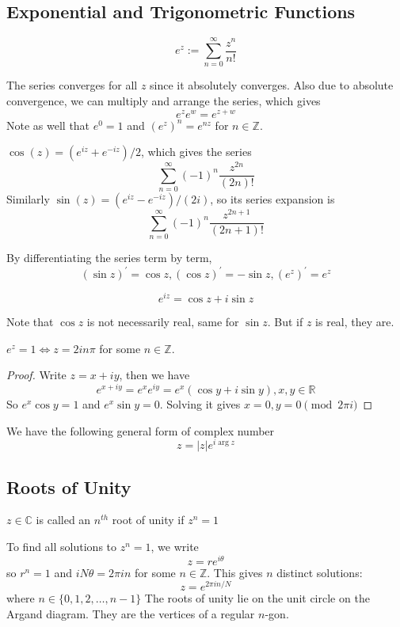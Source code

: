 \subsection{Exponential and Trigonometric Functions}
\begin{definition}
    $$e^z:=\sum_{n=0}^\infty \frac{z^n}{n!}$$
\end{definition}
The series converges for all $z$ since it absolutely converges.
Also due to absolute convergence, we can multiply and arrange the series, which gives
$$e^ze^w=e^{z+w}$$
Note as well that $e^0=1$ and $(e^z)^n=e^{nz}$ for $n\in\mathbb Z$.
\begin{definition}
    $\cos(z)=(e^{iz}+e^{-iz})/2$, which gives the series
    $$\sum_{n=0}^\infty(-1)^n\frac{z^{2n}}{(2n)!}$$
    Similarly $\sin(z)=(e^{iz}-e^{-iz})/(2i)$, so its series expansion is
    $$\sum_{n=0}^\infty(-1)^n\frac{z^{2n+1}}{(2n+1)!}$$
\end{definition}
By differentiating the series term by term,
$$(\sin z)^\prime=\cos z, (\cos z)^\prime =-\sin z, (e^z)^\prime=e^z$$
\begin{theorem}
    $$e^{iz}=\cos z+i\sin z$$
\end{theorem}
Note that $\cos z$ is not necessarily real, same for $\sin z$.
But if $z$ is real, they are.
\begin{lemma}
    $e^z=1\iff z=2in\pi$ for some $n\in\mathbb Z$.
\end{lemma}
\begin{proof}
    Write $z=x+iy$, then we have
    $$e^{x+iy}=e^xe^{iy}=e^x(\cos y+i\sin y),x,y\in\mathbb R$$
    So $e^x\cos y=1$ and $e^x\sin y=0$.
    Solving it gives $x=0, y=0\pmod{2\pi i}$
\end{proof}
We have the following general form of complex number
$$z=|z|e^{i\arg z}$$
\subsection{Roots of Unity}
\begin{definition}
    $z\in\mathbb C$ is called an $n^{th}$ root of unity if $z^n=1$
\end{definition}
To find all solutions to $z^n=1$, we write
$$z=re^{i\theta}$$
so $r^n=1$ and $iN\theta=2\pi in$ for some $n\in\mathbb Z$.
This gives $n$ distinct solutions:
$$z=e^{2\pi in/N}$$
where $n\in \{0,1,2,\ldots ,n-1\}$
The roots of unity lie on the unit circle on the Argand diagram.
They are the vertices of a regular $n$-gon.
